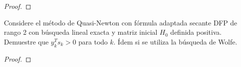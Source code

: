 \documentclass{article}
\newenvironment{theorem}[2][Ejercicio]{\begin{trivlist}
\item[\hskip \labelsep {\bfseries #1}\hskip \labelsep {\bfseries #2.}]}{\end{trivlist}}
\begin{document}
\begin{proof}

\end{proof}
\vspace{0.25in}

\begin{theorem}{9}
    Considere el método de Quasi-Newton con fórmula adaptada secante DFP de rango 2
    con búsqueda lineal exacta y matriz inicial \(H_0\) definida positiva.
    Demuestre que \(y_k^T s_k > 0\) para todo \(k\).
    Ídem si se utiliza la búsqueda de Wolfe.
\end{theorem}

\begin{proof}

\end{proof}
\vspace{0.25in}

\end{document}
